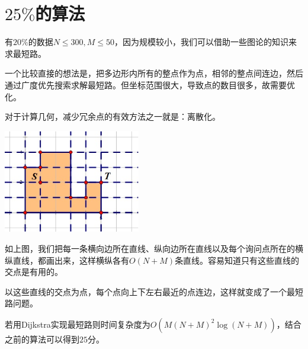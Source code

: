 \documentclass[a4paper]{article}
\begin{document}
\section{$25\%$的算法}
有$20\%$的数据$N \le 300, M \le 50$，因为规模较小，我们可以借助一些图论的知识来求最短路。 \par
一个比较直接的想法是，把多边形内所有的整点作为点，相邻的整点间连边，然后通过广度优先搜索求解最短路。但坐标范围很大，导致点的数目很多，故需要优化。 \par
对于计算几何，减少冗余点的有效方法之一就是：离散化。 \par
\begin{center}
\includegraphics[height=128pt]{maze_0.eps}
\end{center}
\par
如上图，我们把每一条横向边所在直线、纵向边所在直线以及每个询问点所在的横纵直线，都画出来，这样横纵各有$O(N+M)$条直线。容易知道只有这些直线的交点是有用的。 \par
以这些直线的交点为点，每个点向上下左右最近的点连边，这样就变成了一个最短路问题。 \par
若用Dijkstra实现最短路则时间复杂度为$O(M(N+M)^2\log{(N+M)})$，结合之前的算法可以得到$25$分。
\end{document}
